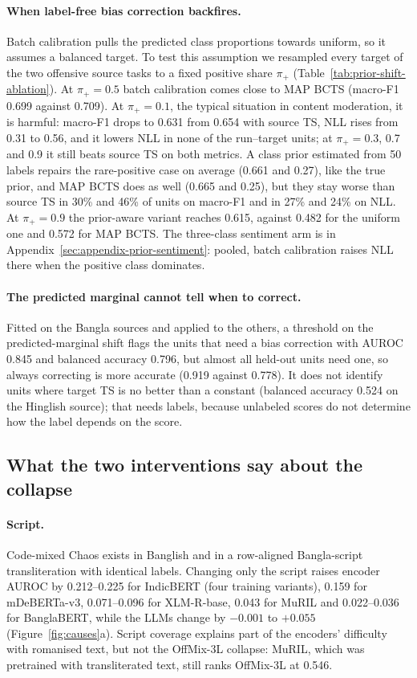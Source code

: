 \paragraph{When label-free bias correction backfires.}
Batch calibration pulls the predicted class proportions towards uniform, so it assumes a balanced target. To test this assumption we
resampled every target of the two offensive source tasks to a fixed positive share $\pi_+$
(Table~\ref{tab:prior-shift-ablation}). At $\pi_+ = 0.5$ batch calibration comes close to MAP BCTS (macro-F1 0.699
against 0.709). At $\pi_+ = 0.1$, the typical situation in content moderation, it is harmful: macro-F1 drops to 0.631
from 0.654 with source TS, NLL rises from 0.31 to 0.56, and it lowers NLL in none of the run--target units; at
$\pi_+ = 0.3$, 0.7 and 0.9 it still beats source TS on both metrics. A class prior estimated from 50 labels repairs the
rare-positive case on average (0.661 and 0.27), like the true prior, and MAP BCTS does as well (0.665 and 0.25), but
they stay worse than source TS in 30\% and 46\% of units on macro-F1 and in 27\% and 24\% on NLL. At $\pi_+ = 0.9$ the prior-aware variant reaches 0.615, against 0.482 for the uniform one and 0.572 for MAP
BCTS. The three-class sentiment arm is in Appendix~\ref{sec:appendix-prior-sentiment}: pooled, batch calibration raises
NLL there when the positive class dominates.



\paragraph{The predicted marginal cannot tell when to correct.}
Fitted on the Bangla sources and applied to the others, a threshold on the predicted-marginal shift flags the units
that need a bias correction with AUROC 0.845 and balanced accuracy 0.796, but almost all held-out units need one, so
always correcting is more accurate (0.919 against 0.778). It does not identify units where target TS is no better than
a constant (balanced accuracy 0.524 on the Hinglish source); that needs labels, because unlabeled scores do not determine
how the label depends on the score.

\subsection{What the two interventions say about the collapse}
\label{sec:results-causes}

\paragraph{Script.}
Code-mixed Chaos exists in Banglish and in a row-aligned Bangla-script transliteration with identical labels. Changing
only the script raises encoder AUROC by 0.212--0.225 for IndicBERT (four training variants), 0.159 for mDeBERTa-v3,
0.071--0.096 for XLM-R-base, 0.043 for MuRIL and 0.022--0.036 for BanglaBERT, while the LLMs change by $-0.001$ to $+0.055$
(Figure~\ref{fig:causes}a). Script coverage explains part of the encoders' difficulty with romanised text, but not the
OffMix-3L collapse: MuRIL, which was pretrained with transliterated text, still ranks OffMix-3L at 0.546.

